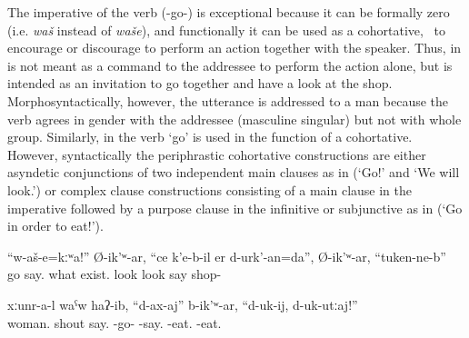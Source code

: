 The imperative of the verb  (-go-) is exceptional because it can be formally zero (i.e. \textit{waš} instead of \textit{waše}), and functionally it can be used as a cohortative, \tie\ to encourage or discourage to perform an action together with the speaker. Thus, in   is not meant as a command to the addressee to perform the action alone, but is intended as an invitation to go together and have a look at the shop. Morphosyntactically, however, the utterance is addressed to a man because the verb agrees in gender with the addressee (masculine singular) but not with whole group. Similarly, in  the verb `go' is used in the function of a cohortative. However, syntactically the periphrastic cohortative constructions are either asyndetic conjunctions of two independent main clauses as in  (`Go!' and `We will look.') or complex clause constructions consisting of a main clause in the imperative followed by a purpose clause in the infinitive or subjunctive as in  (`Go in order to eat!').
%
\begin{exe}
	\ex	\label{ex:‎Let's go (together) and look what is there in the shop}
	\gll	``w-aš-e=kːʷa!''	Ø-ik'ʷ-ar,	``ce	k'e-b-il	er	d-urk'-an=da'',	Ø-ik'ʷ-ar, ``tuken-ne-b''\\
		go		say.	what	exist.	look	look	say	shop-\\
	\glt	{}
	
			\ex	\label{ex:The women shouted ``Let's go eating!''}
		\gll	xːunr-a-l waˁw	haʔ-ib,	``d-ax-aj''	b-ik'ʷ-ar, ``d-uk-ij,	d-uk-utːaj!''\\
			woman. shout	say.	-go-	-say.	\tsc{1/2pl}-eat.	-eat.\\
		\glt	{} 
\end{exe}





